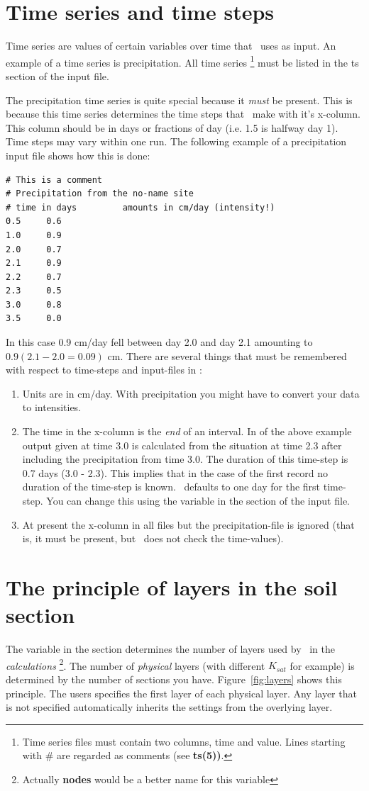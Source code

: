 \section{Time series and time steps}\label{sec:tstep}
Time series are values of certain variables over time that \vamps\
uses as input. An example of a time series is precipitation.  All time
series \footnote{Time series files must contain two columns, time and
value. Lines starting with \# are regarded as comments (see {\bf
ts(5))}.}  must be listed in the ts section of the input file.

The precipitation time series is quite special because it {\em must} be
present. This is because this time series determines the time steps
that \vamps\ make with it's x-column. This column should be in days or
fractions of day (i.e. 1.5 is halfway day 1). Time steps may vary
within one run. The following example of a precipitation input file
shows how this is done:
\begin{verbatim}
# This is a comment
# Precipitation from the no-name site 
# time in days         amounts in cm/day (intensity!)
0.5		0.6
1.0		0.9
2.0		0.7
2.1		0.9
2.2		0.7
2.3		0.5
3.0		0.8
3.5		0.0
\end{verbatim}
In this case 0.9 cm/day fell between day 2.0 and day 2.1 amounting to
$ 0.9  (2.1 - 2.0 = 0.09)$ cm.  There are
several things that must be remembered with respect to time-steps and
input-files in \vamps{}:
\begin{enumerate}
\item Units are in cm/day. With precipitation you might have to convert
your data to intensities.
\item The time in the x-column is the {\em end} of an interval. In
of the above example output given at time 3.0 is calculated from the
situation at time 2.3 after including the precipitation
from time 3.0.  The duration of this time-step is 0.7 days (3.0 - 2.3). This
implies that in the case of the first record no duration of the time-step is
known. \vamps\ defaults to one day for the first time-step. You can change
this using the \inivar{firststep} variable in the \inisec{time} section of the
input file.
\item At present the x-column in all files but the precipitation-file
is ignored (that is, it must be present, but \vamps\ does not check
the time-values).
\end{enumerate}


\section{The principle of layers in the soil section}\label{sec:physlay}
The \inivar{layers} variable in the \inisec{soil} section determines the
number of layers used by \vamps\ in the {\em calculations}
\footnote{Actually {\bf nodes} would be a better name for this
variable}. The number of {\em physical} layers (with different
$K_{sat}$ for example) is determined by the number of 
sections you have. Figure~\ref{fig:layers} shows this principle.  The
users specifies the first layer of each physical layer. Any layer that
is not specified automatically inherits the settings from the
overlying layer.

